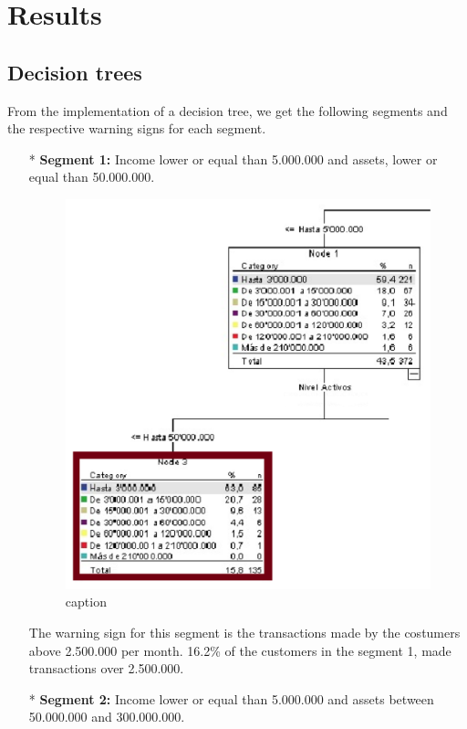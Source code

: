 \chapter{Results}
\label{chap:results}
\section{Decision trees}
From the implementation of a decision tree, we get the following segments and the respective warning signs for each segment.
\begin{itemize}
\item[*] \textbf{Segment 1:}
Income lower or equal than 5.000.000 and assets, lower or equal than 50.000.000.

\begin{figure}[ht!]
  \centering
  \includegraphics[scale=0.5]{Segmento1}
  \caption{caption}
\end{figure}

The warning sign for this segment is the transactions made by the costumers above 2.500.000 per month.  16.2\% of the customers in the segment 1, made transactions over 2.500.000.
\item[*] \textbf{Segment 2:}
Income lower or equal than 5.000.000 and assets between 50.000.000 and 300.000.000.


\end{itemize}
